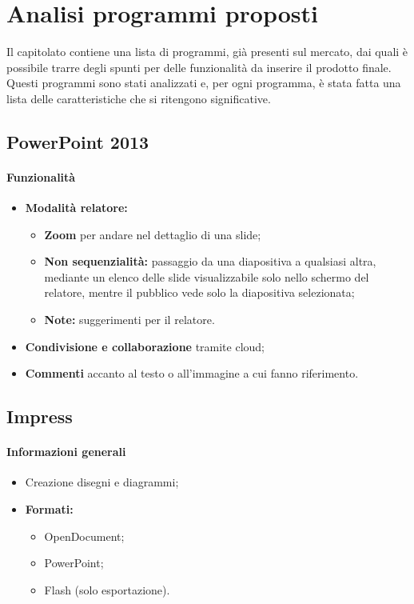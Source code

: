 \section{Analisi programmi proposti}
Il capitolato contiene una lista di programmi, già presenti sul mercato, dai quali è possibile trarre degli spunti per delle funzionalità da inserire il prodotto finale.\\
Questi programmi sono stati analizzati e, per ogni programma, è stata fatta una lista delle caratteristiche che si ritengono significative.
\subsection{PowerPoint 2013}
\paragraph{Funzionalità}
 \begin{itemize}
  \item \textbf{Modalità relatore:}
  \begin{itemize}
   \item \textbf{Zoom} per andare nel dettaglio di una slide;
   \item \textbf{Non sequenzialità:} passaggio da una diapositiva a qualsiasi altra, mediante un elenco delle slide visualizzabile solo nello schermo del relatore, 
   mentre il pubblico vede solo la diapositiva selezionata;
   \item \textbf{Note:} suggerimenti per il relatore.
  \end{itemize}
  \item \textbf{Condivisione e collaborazione} tramite cloud;
  \item \textbf{Commenti} accanto al testo o all'immagine a cui fanno riferimento.
 \end{itemize}
\subsection{Impress}
\paragraph{Informazioni generali}
\begin{itemize}
 \item Creazione disegni e diagrammi;
 \item \textbf{Formati:} 
 \begin{itemize}
  \item OpenDocument;
  \item PowerPoint;
  \item Flash (solo esportazione).
 \end{itemize}
\end{itemize}
